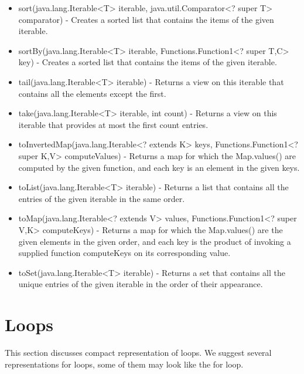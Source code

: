 \begin{itemize}
	\item sort(java.lang.Iterable<T> iterable, java.util.Comparator<? super T> comparator) - Creates a sorted list that contains the items of the given iterable.
	\item sortBy(java.lang.Iterable<T> iterable, Functions.Function1<? super T,C> key) - Creates a sorted list that contains the items of the given iterable.
	\item tail(java.lang.Iterable<T> iterable) - Returns a view on this iterable that contains all the elements except the first.
	\item take(java.lang.Iterable<T> iterable, int count) - Returns a view on this iterable that provides at most the first count entries.
	\item toInvertedMap(java.lang.Iterable<? extends K> keys, Functions.Function1<? super K,V> computeValues) - Returns a map for which the Map.values() are computed by the given function, and each key is an element in the given keys.
	\item toList(java.lang.Iterable<T> iterable) - Returns a list that contains all the entries of the given iterable in the same order.
	\item toMap(java.lang.Iterable<? extends V> values, Functions.Function1<? super V,K> computeKeys) - Returns a map for which the Map.values() are the given elements in the given order, and each key is the product of invoking a supplied function computeKeys on its corresponding value.
	\item toSet(java.lang.Iterable<T> iterable) - Returns a set that contains all the unique entries of the given iterable in the order of their appearance.
\end{itemize}
\section{Loops}
This section discusses compact representation of loops. We suggest several representations for loops, some of them may look like the for loop.
